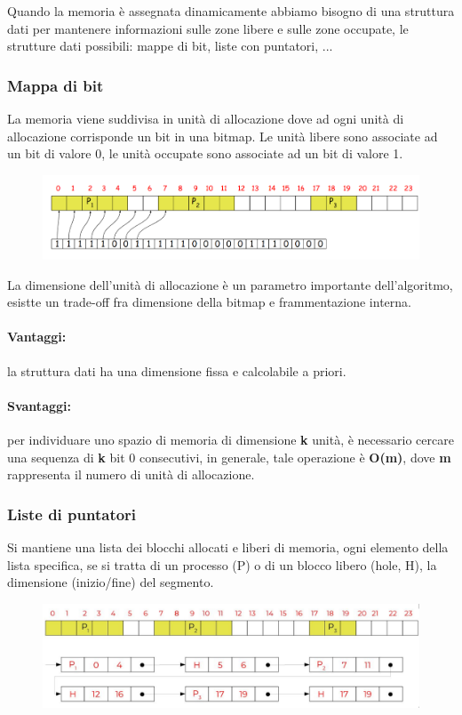 Quando la memoria è assegnata dinamicamente abbiamo bisogno di una struttura dati per mantenere informazioni sulle zone
libere e sulle zone occupate, le strutture dati possibili: mappe di bit, liste con puntatori, ...
\newpage
\subsubsection{Mappa di bit}
La memoria viene suddivisa in unità di allocazione dove ad ogni unità di allocazione corrisponde un bit in una bitmap. Le unità libere sono associate ad un bit di valore 0, le unità occupate sono
associate ad un bit di valore 1.

\begin{figure} [h]
    \centering
    \includegraphics[width=0.7\linewidth]{Images/Screenshot 2025-01-17 at 15-29-40 so-05-memoria - so-05-memoria.pdf.png}
\end{figure}

La dimensione dell'unità di allocazione è un parametro importante
dell'algoritmo, esistte un trade-off fra dimensione della bitmap e frammentazione interna.
\paragraph{Vantaggi:} la struttura dati ha una dimensione fissa e calcolabile a priori.
\paragraph{Svantaggi:} per individuare uno spazio di memoria di dimensione \textbf{k} unità, è necessario
cercare una sequenza di \textbf{k} bit 0 consecutivi, in generale, tale operazione è \textbf{O(m)}, dove \textbf{m} rappresenta il numero di unità di
allocazione.

\subsubsection{Liste di puntatori}

Si mantiene una lista dei blocchi allocati e liberi di memoria, ogni elemento della lista specifica, se si tratta di un processo (P) o di un blocco libero (hole, H), la dimensione (inizio/fine) del segmento.

\begin{figure} [h]
    \centering
    \includegraphics[width=0.7\linewidth]{Images/Screenshot 2025-01-17 at 15-32-58 so-05-memoria - so-05-memoria.pdf.png}
\end{figure}

